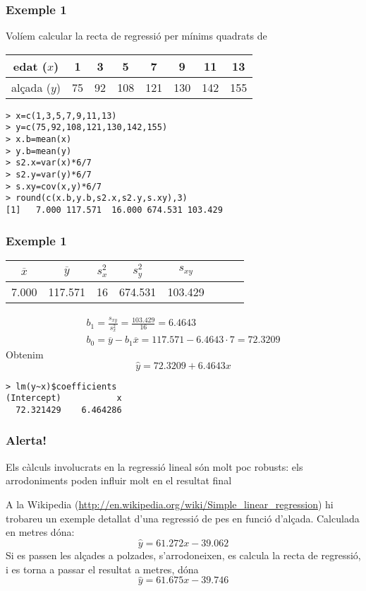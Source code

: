 \documentclass[12pt,t]{beamer}
\theoremstyle{plain}
\theoremstyle{definition}
\begin{document}
\begin{frame}[fragile]
\frametitle{Exemple 1}
Volíem calcular la recta de regressió per mínims quadrats de
\begin{center}
\begin{tabular}{c|ccccccc}
\hline
edat ($x$) & 1 & 3 & 5 & 7 & 9 & 11 & 13\\
\hline
alçada ($y$) & 75 & 92 & 108 & 121 & 130 & 142 & 155\\
\hline
\end{tabular}
\end{center}
\begin{verbatim}
> x=c(1,3,5,7,9,11,13)
> y=c(75,92,108,121,130,142,155)
> x.b=mean(x)
> y.b=mean(y)
> s2.x=var(x)*6/7
> s2.y=var(y)*6/7
> s.xy=cov(x,y)*6/7
> round(c(x.b,y.b,s2.x,s2.y,s.xy),3)
[1]   7.000 117.571  16.000 674.531 103.429
\end{verbatim}
\end{frame}

\begin{frame}[fragile]
\frametitle{Exemple 1}
\vspace*{-2ex}

\begin{center}
\begin{tabular}{cccccccc}
$\overline{x}$ &  $\overline{y}$ & $s_x^2$ & $s_y^2$ & $s_{xy}$\\ \hline
7.000 & 117.571 & 16 & 674.531 & 103.429
\end{tabular}
\end{center}
$$
\begin{array}{l}
\displaystyle b_1 =\frac{s_{xy}}{s_x^2}=\frac{103.429}{16}=6.4643\\[2ex]
\displaystyle b_0 = \overline{y}-b_1 \overline{x} =117.571-6.4643\cdot 7=72.3209
\end{array}
$$
Obtenim
$$
\widehat{y}=72.3209+6.4643x
$$
\medskip

\begin{verbatim}
> lm(y~x)$coefficients
(Intercept)           x 
  72.321429    6.464286 
\end{verbatim}
\end{frame}

\begin{frame}[fragile]
\frametitle{Alerta!}

Els càlculs involucrats en la regressió lineal són molt poc robusts: els arrodoniments
poden influir molt en el resultat final
\bigskip

A la Wikipedia (\url{http://en.wikipedia.org/wiki/Simple_linear_regression}) hi trobareu un exemple detallat d'una regressió de pes en funció d'alçada. Calculada en metres dóna:
$$
\widehat{y}=61.272x-39.062
$$
Si es passen les alçades a polzades, s'arrodoneixen, es calcula la recta de regressió, i es torna a passar  el resultat a metres, dóna
$$
\widehat{y}=61.675x-39.746
$$




\end{frame}
\end{document}
